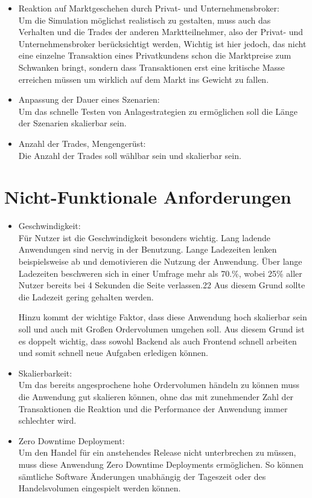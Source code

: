 \begin{itemize}
		\item Reaktion auf Marktgeschehen durch Privat- und Unternehmensbroker: \\
			Um die Simulation möglichst realistisch zu gestalten, muss auch das Verhalten und die Trades der anderen Marktteilnehmer, also der Privat- und Unternehmensbroker berücksichtigt werden, Wichtig ist hier jedoch, das nicht eine einzelne Transaktion eines Privatkundens schon die Marktpreise zum Schwanken bringt, sondern dass Transaktionen erst eine kritische Masse erreichen müssen um wirklich auf dem Markt ins Gewicht zu fallen. 
			
		\item Anpassung der Dauer eines Szenarien: \\
			Um das schnelle Testen von Anlagestrategien zu ermöglichen soll die Länge der Szenarien skalierbar sein. 
			
		\item Anzahl der Trades, Mengengerüst: \\
			Die Anzahl der Trades soll wählbar sein und skalierbar sein. 
	\end{itemize}
\section{Nicht-Funktionale Anforderungen}
		\begin{itemize}
		\item Geschwindigkeit: \\
			Für Nutzer ist die Geschwindigkeit besonders wichtig. Lang ladende Anwendungen
			sind nervig in der Benutzung. Lange Ladezeiten lenken beispielsweise
			ab und demotivieren die Nutzung der Anwendung. Über lange Ladezeiten
			beschweren sich in einer Umfrage mehr als 70.\%, wobei 25\% aller Nutzer bereits bei 4
			Sekunden die Seite verlassen.22 Aus diesem Grund sollte die Ladezeit gering gehalten
			werden. %
			
			Hinzu kommt der wichtige Faktor, dass diese Anwendung hoch skalierbar sein soll und auch mit Großen Ordervolumen umgehen soll. Aus diesem Grund ist es doppelt wichtig, dass sowohl Backend als auch Frontend schnell arbeiten und somit schnell neue Aufgaben erledigen können.
			
		\item Skalierbarkeit: \\
			Um das bereits angesprochene hohe Ordervolumen händeln zu können muss die Anwendung gut skalieren können, ohne das mit zunehmender Zahl der Transaktionen die Reaktion und die Performance der Anwendung immer schlechter wird. 
			
		\item Zero Downtime Deployment: \\
			Um den Handel für ein anstehendes Release nicht unterbrechen zu müssen, muss diese Anwendung Zero Downtime Deployments ermöglichen. So können sämtliche Software Änderungen unabhängig der Tageszeit oder des Handelsvolumen eingespielt werden können. 
	\end{itemize}

